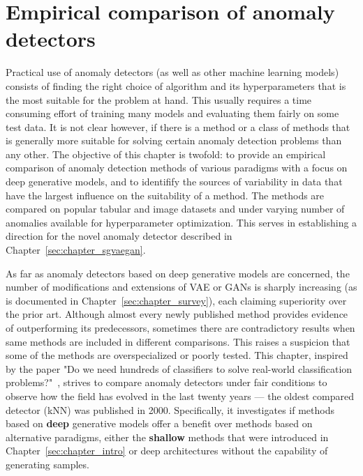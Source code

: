 \chapter{Empirical comparison of anomaly detectors} \label{sec:chapter_comparison}

Practical use of anomaly detectors (as well as other machine learning models) consists of finding the right choice of algorithm and its hyperparameters that is the most suitable for the problem at hand. This usually requires a time consuming effort of training many models and evaluating them fairly on some test data. It is not clear however, if there is a method or a class of methods that is generally more suitable for solving certain anomaly detection problems than any other. The objective of this chapter is twofold: to provide an empirical comparison of anomaly detection methods of various paradigms with a focus on deep generative models, and to identifify the sources of variability in data that have the largest influence on the suitability of a method. The methods are compared on popular tabular and image datasets and under varying number of anomalies available for hyperparameter optimization. This serves in establishing a direction for the novel anomaly detector described in Chapter~\ref{sec:chapter_sgvaegan}.

As far as anomaly detectors based on deep generative models are concerned, the number of modifications and extensions of VAE or GANs is sharply increasing (as is documented in Chapter~\ref{sec:chapter_survey}), each claiming superiority over the prior art. Although almost every newly published method provides evidence of outperforming its predecessors, sometimes there are contradictory results when same methods are included in different comparisons. This raises a suspicion that some of the methods are overspecialized or poorly tested. This chapter, inspired by the paper "Do we need hundreds of classifiers to solve real-world classification problems?"~\cite{fernandez2014we}, strives to compare anomaly detectors under fair conditions to observe how the field has evolved in the last twenty years --- the oldest compared detector (kNN) was published in 2000. Specifically, it investigates if methods based on \textbf{deep} generative models offer a benefit over methods based on alternative paradigms, either the \textbf{shallow} methods that were introduced in Chapter~\ref{sec:chapter_intro} or deep architectures without the capability of generating samples.


